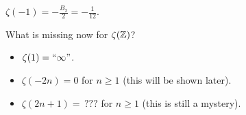 \begin{example}
$\zeta(-1) = - \frac{B_{2}}{2} = - \frac{1}{12}$.
\end{example}

What is missing now for $\zeta(\mathbb{Z})$?

\begin{itemize}
    \item $\zeta(1) = ``\infty"$.
    \item $\zeta(-2n) = 0$ for $n \geq 1$ (this will be shown later).
    \item $\zeta(2n+1) = \, ???$ for $n \geq 1$ (this is still a mystery).
\end{itemize}